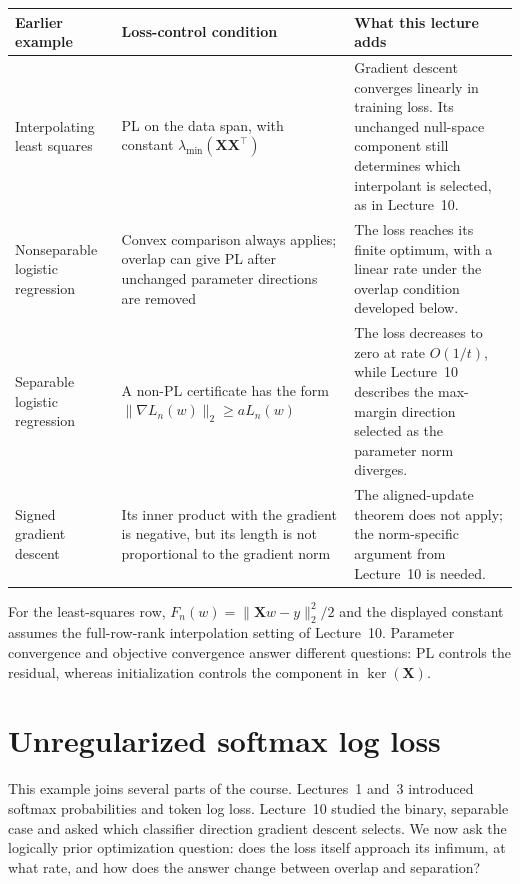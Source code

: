 \documentclass[11pt,twoside]{article}
\theoremstyle{definition}
\theoremstyle{remark}
\begin{document}
\begin{center}
\renewcommand{\arraystretch}{1.25}
\begin{tabular}{@{}>{\raggedright\arraybackslash}p{}
                    >{\raggedright\arraybackslash}p{}
                    >{\raggedright\arraybackslash}p{}@{}}
\toprule
Earlier example & Loss-control condition & What this lecture adds \\
\midrule
Interpolating least squares
& PL on the data span, with constant
$\lambda_{\min}(\mathbf X\mathbf X^\top)$
& Gradient descent converges linearly in training loss. Its unchanged
null-space component still determines which interpolant is selected, as in
Lecture~10.\\
Nonseparable logistic regression
& Convex comparison always applies; overlap can give PL after unchanged
parameter directions are removed
& The loss reaches its finite optimum, with a linear rate under the overlap
condition developed below.\\
Separable logistic regression
& A non-PL certificate has the form
$\|\nabla L_n(w)\|_2\ge aL_n(w)$
& The loss decreases to zero at rate $O(1/t)$, while Lecture~10 describes the
max-margin direction selected as the parameter norm diverges.\\
Signed gradient descent
& Its inner product with the gradient is negative, but its length is not
proportional to the gradient norm
& The aligned-update theorem does not apply; the norm-specific argument from
Lecture~10 is needed.\\
\bottomrule
\end{tabular}
\end{center}

For the least-squares row, $F_n(w)=\|\mathbf Xw-y\|_2^2/2$ and the displayed
constant assumes the full-row-rank interpolation setting of Lecture~10.
Parameter convergence and objective convergence answer different questions:
PL controls the residual, whereas initialization controls the component in
$\ker(\mathbf X)$.

\section{Unregularized softmax log loss}
\label{sec:softmax}

This example joins several parts of the course. Lectures~1 and~3 introduced
softmax probabilities and token log loss. Lecture~10 studied the binary,
separable case and asked which classifier direction gradient descent selects.
We now ask the logically prior optimization question: does the loss itself
approach its infimum, at what rate, and how does the answer change between
overlap and separation?
\end{document}
